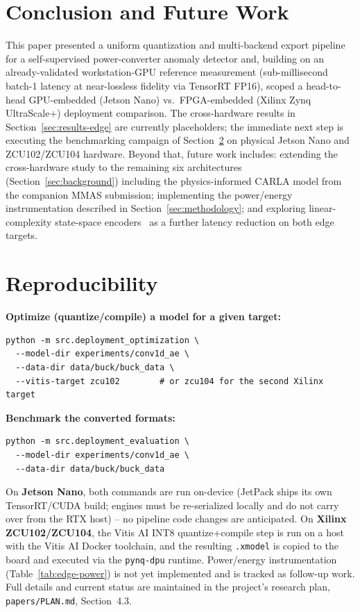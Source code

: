 \documentclass[11pt,a4paper]{article}
\begin{document}
\section{Conclusion and Future Work}
\label{sec:conclusion}

This paper presented a uniform quantization and multi-backend export pipeline for a
self-supervised power-converter anomaly detector and, building on an already-validated
workstation-GPU reference measurement (sub-millisecond batch-1 latency at
near-lossless fidelity via TensorRT FP16), scoped a head-to-head GPU-embedded (Jetson
Nano) vs.\ FPGA-embedded (Xilinx Zynq UltraScale+) deployment comparison. The
cross-hardware results in Section~\ref{sec:results-edge} are currently placeholders; the
immediate next step is executing the benchmarking campaign of
Section~\ref{sec:reproducibility} on physical Jetson Nano and ZCU102/ZCU104 hardware.
Beyond that, future work includes: extending the cross-hardware study to the remaining
six architectures (Section~\ref{sec:background}) including the physics-informed CARLA
model from the companion MMAS submission; implementing the power/energy instrumentation
described in Section~\ref{sec:methodology}; and exploring linear-complexity state-space
encoders~\cite{gu2023mamba} as a further latency reduction on both edge targets.

\section{Reproducibility}
\label{sec:reproducibility}

\textbf{Optimize (quantize/compile) a model for a given target:}
\begin{verbatim}
python -m src.deployment_optimization \
  --model-dir experiments/conv1d_ae \
  --data-dir data/buck/buck_data \
  --vitis-target zcu102        # or zcu104 for the second Xilinx target
\end{verbatim}
\textbf{Benchmark the converted formats:}
\begin{verbatim}
python -m src.deployment_evaluation \
  --model-dir experiments/conv1d_ae \
  --data-dir data/buck/buck_data
\end{verbatim}
On \textbf{Jetson Nano}, both commands are run on-device (JetPack ships its own
TensorRT/CUDA build; engines must be re-serialized locally and do not carry over from
the RTX host) -- no pipeline code changes are anticipated. On \textbf{Xilinx
ZCU102/ZCU104}, the Vitis AI INT8 quantize+compile step is run on a host with the Vitis
AI Docker toolchain, and the resulting \texttt{.xmodel} is copied to the board and
executed via the \texttt{pynq-dpu} runtime. Power/energy instrumentation
(Table~\ref{tab:edge-power}) is not yet implemented and is tracked as follow-up work.
Full details and current status are maintained in the project's research plan,
\texttt{papers/PLAN.md}, Section~4.3.
\end{document}
